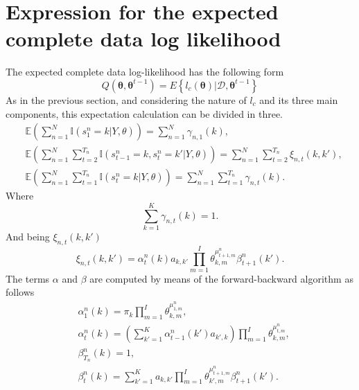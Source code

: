 \documentclass[12pt]{article}%
\newcommand{\indicator}{\mathbb{I}}
\newcommand{\expectation}{\mathbb{E}}
\begin{document}
\section{Expression for the expected complete data log likelihood}
The expected complete data log-likelihood has the following form
\begin{equation}
Q \left( \boldsymbol { \theta } , \boldsymbol { \theta } ^ { t - 1 } \right) = E \left\{ l _ { c } ( \boldsymbol { \theta } ) | \mathcal { D } , \boldsymbol { \theta } ^ { t - 1 } \right\}
\end{equation}
As in the previous section, and considering the nature of $l_{c}$ and its three main components, this expectation calculation can be divided in three.
\begin{align}
& \expectation \left( \sum _ { n = 1 } ^ { N } \indicator \left( s _ { 1 } ^ { n } = k | Y , \theta \right) \right) = \sum _ { n = 1 } ^ { N } \gamma _ { n , 1 } ( k ), \\
& \expectation \left( \sum _ { n = 1 } ^ { N } \sum _ { t = 2 } ^ { T _ { n } } \indicator \left( s _ { t - 1 } ^ { n } = k , s _ { t } ^ { n } = k' | Y , \theta \right) \right) = \sum _ { n = 1 } ^ { N } \sum _ { t = 2 } ^ { T _ { n } } \xi _ { n , t } ( k , k' ), \\
& \expectation \left( \sum _ { n = 1 } ^ { N } \sum _ { t = 1 } ^ { T _ { n } } \indicator \left( s _ { t } ^ { n } = k | Y , \theta \right) \right) = \sum _ { n = 1 } ^ { N } \sum _ { t = 1 } ^ { T _ { n } } \gamma _ { n , t } ( k ).
\end{align}
Where 
\begin{equation}
\sum _ { k = 1 } ^ { K } \gamma _ { n , t } ( k ) = 1.
\end{equation}
\noindent And being $\xi _ { n,t } ( k , k' )$ 
\begin{equation}
\xi _ { n,t } ( k , k' ) = \alpha _ { t }^{n} ( k ) a _ { k,k' } \prod\limits_{m=1}^{I} \theta_{k,m}^{\mu^{n}_{t+1,m}} \beta _ { t + 1 }^{n} ( k' ).
\end{equation}
The terms $\alpha$ and $\beta$ are computed by means of the forward-backward algorithm as follows
\begin{align}
&\alpha _ { 1 }^{n} ( k ) = \pi _ { k } \prod\limits_{m=1}^{I}\theta_{k,m}^{\mu^{n}_{1,m}}, \\
&\alpha _ { t }^{n} ( k ) = \left( \sum _ { k' = 1 } ^ { K } \alpha _ { t - 1 }^{n} ( k' ) a _ { k',k } \right) \prod\limits_{m=1}^{I}\theta_{k,m}^{\mu^{n}_{t,m}}, \\
&\beta _ { T_{n} }^{n} ( k ) = 1, \\
& \beta _ { t }^{n} ( k ) = \sum _ {k' = 1 } ^ { K } a _ { k,k'}  \prod\limits_{m=1}^{I}\theta_{k',m}^{\mu^{n}_{t+1,m}}  \beta _ { t + 1 }^{n} ( k' ).
\end{align}
\end{document}

